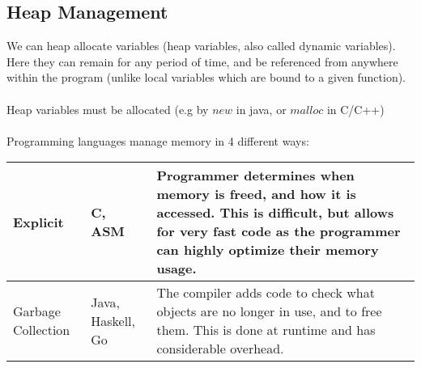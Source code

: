 \documentclass{report}
\begin{document}
\subsection*{Heap Management}
We can heap allocate variables (heap variables, also called dynamic variables). Here they can remain for any period of time, and be referenced from anywhere within the program (unlike local variables which are bound to a given function).
\\
\\ Heap variables must be allocated (e.g by $new$ in java, or $malloc$ in C/C++)
\\
\\ Programming languages manage memory in 4 different ways:
\begin{center}
	\begin{tabular}{l l p{}}
		Explicit           & C, ASM            & Programmer determines when memory is freed, and how it is accessed. This is difficult, but allows for very fast code as the programmer can highly optimize their memory usage. \\
		\hline
		Garbage Collection & Java, Haskell, Go & The compiler adds code to check what objects are no longer in use, and to free them. This is done at runtime and has considerable overhead.                                    \\
	\end{tabular}
\end{center}
\end{document}
